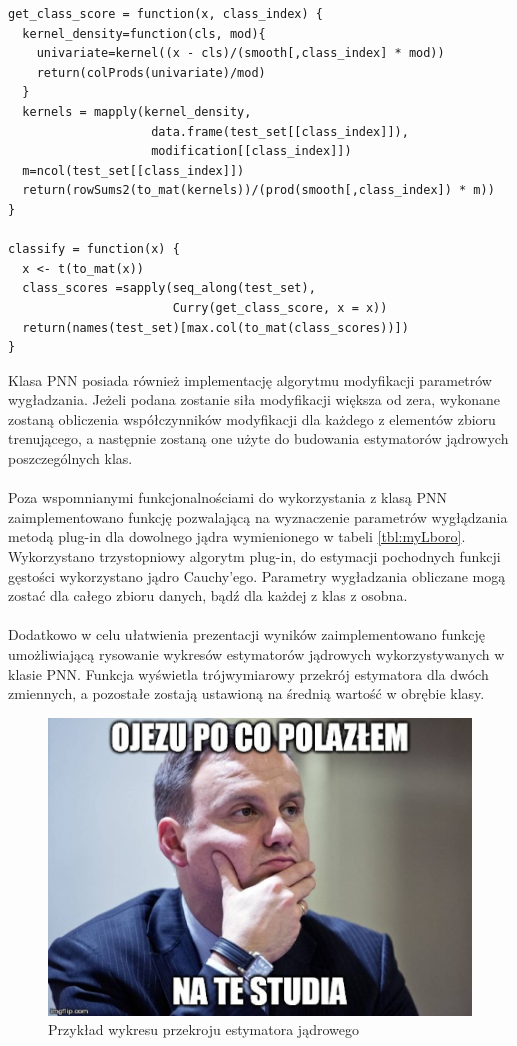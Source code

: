 \documentclass[a4paper,12pt,twoside]{article}
\begin{document}
\newpage
\begin{lstlisting}[caption={Kod funkcji classify i get\_class\_score}]
get_class_score = function(x, class_index) {
  kernel_density=function(cls, mod){
    univariate=kernel((x - cls)/(smooth[,class_index] * mod))
    return(colProds(univariate)/mod)
  }
  kernels = mapply(kernel_density,
                    data.frame(test_set[[class_index]]),
                    modification[[class_index]])
  m=ncol(test_set[[class_index]])
  return(rowSums2(to_mat(kernels))/(prod(smooth[,class_index]) * m))
}

classify = function(x) {
  x <- t(to_mat(x))
  class_scores =sapply(seq_along(test_set),
                       Curry(get_class_score, x = x))
  return(names(test_set)[max.col(to_mat(class_scores))])
}
\end{lstlisting}
Klasa PNN posiada również implementację algorytmu modyfikacji parametrów wygładzania. Jeżeli podana zostanie siła modyfikacji większa od zera, wykonane zostaną obliczenia współczynników modyfikacji dla każdego z elementów zbioru trenującego, a następnie zostaną one użyte do budowania estymatorów jądrowych poszczególnych klas.
\paragraph{}
Poza wspomnianymi funkcjonalnościami do wykorzystania z klasą PNN zaimplementowano funkcję pozwalającą na wyznaczenie parametrów wygłądzania metodą plug-in dla dowolnego jądra wymienionego w tabeli \ref{tbl:myLboro}. Wykorzystano trzystopniowy algorytm plug-in, do estymacji pochodnych funkcji gęstości wykorzystano jądro Cauchy'ego. Parametry wygładzania obliczane mogą zostać dla całego zbioru danych, bądź dla każdej z klas z osobna. 
\paragraph{}
\newpage
Dodatkowo w celu ułatwienia prezentacji wyników zaimplementowano funkcję umożliwiającą rysowanie wykresów estymatorów jądrowych wykorzystywanych w klasie PNN. Funkcja wyświetla trójwymiarowy przekrój estymatora dla dwóch zmiennych, a pozostałe zostają ustawioną na średnią wartość w obrębie klasy.
\begin{figure}[h]
    \centering
    \includegraphics[width=1\textwidth]{dudel.jpg}
    \caption{Przykład wykresu przekroju estymatora jądrowego}
\end{figure}
\newpage
\end{document}
